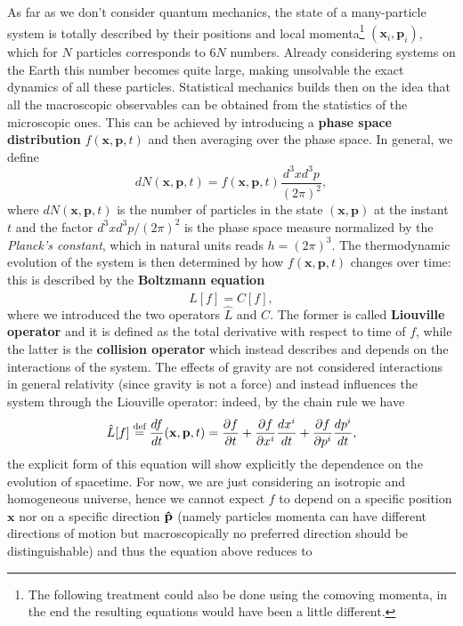 As far as we don't consider quantum mechanics, the state of a many-particle system is totally described by their positions and local momenta\footnote{The following treatment could also be done using the comoving momenta, in the end the resulting equations would have been a little different.} $(\mathbf x_i,\mathbf p_i)$, which for $N$ particles corresponds to $6N$ numbers. Already considering systems on the Earth this number becomes quite large, making unsolvable the exact dynamics of all these particles. Statistical mechanics builds then on the idea that all the macroscopic observables can be obtained from the statistics of the microscopic ones. This can be achieved by introducing a \textbf{phase space distribution} $f(\mathbf x,\mathbf p, t)$ and then averaging over the phase space. In general, we define
\begin{equation}
    \label{eq:phspace_dist}
    dN(\mathbf x,\mathbf p, t)=f(\mathbf x,\mathbf p, t) \frac{d^3xd^3p}{(2\pi)^2},
\end{equation}
where $dN(\mathbf x,\mathbf p, t)$ is the number of particles in the state $(\mathbf x,\mathbf p)$ at the instant $t$ and the factor $d^3xd^3p/(2\pi)^2$ is the phase space measure normalized by the \emph{Planck's constant}, which in natural units reads $h=(2\pi)^{3}$. The thermodynamic evolution of the system is then determined by how $f(\mathbf x,\mathbf p, t)$ changes over time: this is described by the \textbf{Boltzmann equation}
\begin{equation}
    \label{eq:Boltzmann}
    \hat{L}[f]=C[f],
\end{equation}
where we introduced the two operators $\hat{L}$ and $C$. The former is called \textbf{Liouville operator} and it is defined as the total derivative with respect to time of $f$, while the latter is the \textbf{collision operator} which instead describes and depends on the interactions of the system. The effects of gravity are not considered interactions in general relativity (since gravity is not a force) and instead influences the system through the Liouville operator: indeed, by the chain rule we have 
$$ 
\hat{L}[f]\stackrel{\text{def}}{=}\frac{df}{dt}(\mathbf x,\mathbf p, t)= \frac{\partial f}{\partial t}+\frac{\partial f}{\partial x^i}\frac{dx^i}{dt}+\frac{\partial f}{\partial p^i}\frac{dp^i}{dt},
$$ 
the explicit form of this equation will show explicitly the dependence on the evolution of spacetime. For now, we are just considering an isotropic and homogeneous universe, hence we cannot expect $f$ to depend on a specific position $\mathbf{x}$ nor on a specific direction $\mathbf{\hat{p}}$ (namely particles momenta can have different directions of motion but macroscopically no preferred direction should be distinguishable) and thus the equation above reduces to 
